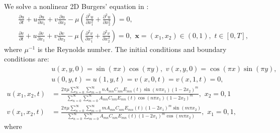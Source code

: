 \begin{example}
\rm
\label{example2}
We solve a nonlinear 2D Burgers' equation in \cite{gao2017analytical}:
\begin{equation}
\begin{aligned}
    &\frac{\partial u}{\partial t} + u \frac{\partial u}{\partial x_1} + v \frac{\partial u}{\partial x_2} - \mu \left( \frac{\partial^2 u}{\partial x^2_1} + \frac{\partial^2 u}{\partial x_2^2} \right) = 0, \quad\\
    &\frac{\partial v}{\partial t} + u \frac{\partial v}{\partial x_1} + v \frac{\partial v}{\partial x_2} - \mu \left( \frac{\partial^2 v}{\partial x^2_1} + \frac{\partial^2 v}{\partial x_2^2} \right) = 0, \,\, \bm x=(x_1, x_2)\in(0, 1), \,\, t\in[0, T], 
    \end{aligned}
    \label{burgers_equation}
\end{equation}
where $\mu^{-1}$ is the Reynolds number. The initial conditions and boundary conditions are:
\begin{equation}
\begin{aligned}
    &u(x, y, 0)  = \sin(\pi x) \cos(\pi y),\,\,
    v(x, y, 0)  = \cos(\pi x) \sin(\pi y),\\
    &u(0, y, t) = u(1, y, t) = v(x, 0, t) = v(x, 1, t) = 0,\\
    u(x_1, x_2, t) &= \frac{2\pi\mu \displaystyle\sum_{n=0}^{\infty} \sum_{m=0}^{\infty} n A_{mn} C_{nm} E_{mn}(t) \sin(n\pi x_1) (1-2x_2)^m}
{\displaystyle\sum_{n=0}^{\infty} \sum_{m=0}^{\infty} A_{mn} C_{nm} E_{mn}(t) \cos(n\pi x_1)(1-2x_2)^m}, \,\,x_2=0, 1 \\
v(x_1, x_2, t) &= \frac{2\pi\mu \displaystyle\sum_{n=0}^{\infty} \sum_{m=0}^{\infty} m A_{mn} C_{nm} E_{mn}(t) (1-2x_1)^m \sin(m\pi x_2)}
{\displaystyle\sum_{n=0}^{\infty} \sum_{m=0}^{\infty} A_{mn} C_{nm} E_{mn}(t)(1-2x_1)^m  \cos(m\pi x_2)}, \,\,x_1=0, 1,
    \end{aligned}
    \label{ic_bc}
\end{equation}
where 
\begin{align}

\end{align}
\end{example}

